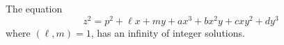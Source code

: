 \begin{proposition}
    The equation
\[
    z^2=p^2+\ell x+my+ax^3+bx^2y+cxy^2+dy^3
\]
    where $(\ell,m)=1$, has an infinity of integer solutions.
\end{proposition}
